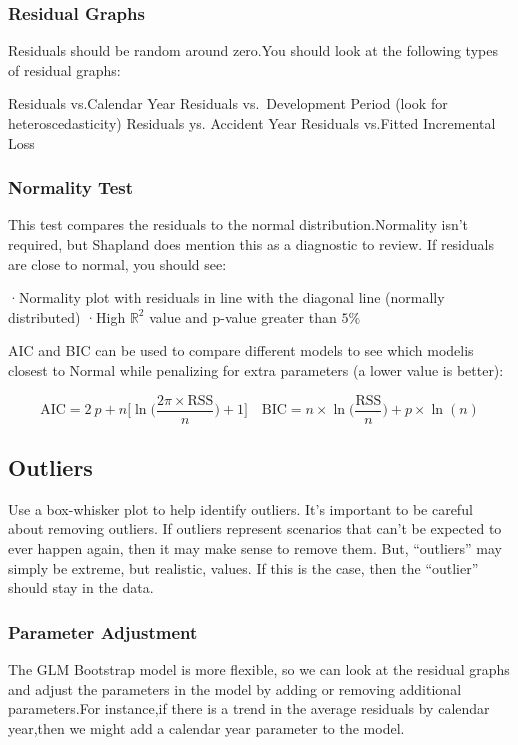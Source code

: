 \documentclass[
]{article}
\begin{document}
\subsubsection{Residual Graphs}\label{residual-graphs-1}

Residuals should be random around zero.You should look at the following
types of residual graphs:

Residuals vs.Calendar Year Residuals vs.~Development Period (look for
heteroscedasticity) Residuals ys. Accident Year Residuals vs.Fitted
Incremental Loss

\subsubsection{Normality Test}\label{normality-test}

This test compares the residuals to the normal distribution.Normality
isn't required, but Shapland does mention this as a diagnostic to
review. If residuals are close to normal, you should see:

·Normality plot with residuals in line with the diagonal line (normally
distributed) ·High \(\mathbb{R}^{2}\) value and p-value greater than
\(5\%\)

AIC and BIC can be used to compare different models to see which modelis
closest to Normal while penalizing for extra parameters (a lower value
is better):

\[\mathrm{AIC}=2\:p+n\Bigg[\ln\Bigg(\frac{2\pi\times\mathrm{RSS}}{n}\Bigg)+1\Bigg]\quad\mathrm{BIC}=n\times\ln\Bigg(\frac{\mathrm{RSS}}{n}\Bigg)+p\times\ln(n)\]

\subsection{Outliers}\label{outliers}

Use a box-whisker plot to help identify outliers. It's important to be
careful about removing outliers. If outliers represent scenarios that
can't be expected to ever happen again, then it may make sense to remove
them. But, ``outliers'' may simply be extreme, but realistic, values. If
this is the case, then the ``outlier'' should stay in the data.

\subsubsection{Parameter Adjustment}\label{parameter-adjustment}

The GLM Bootstrap model is more flexible, so we can look at the residual
graphs and adjust the parameters in the model by adding or removing
additional parameters.For instance,if there is a trend in the average
residuals by calendar year,then we might add a calendar year parameter
to the model.
\end{document}

